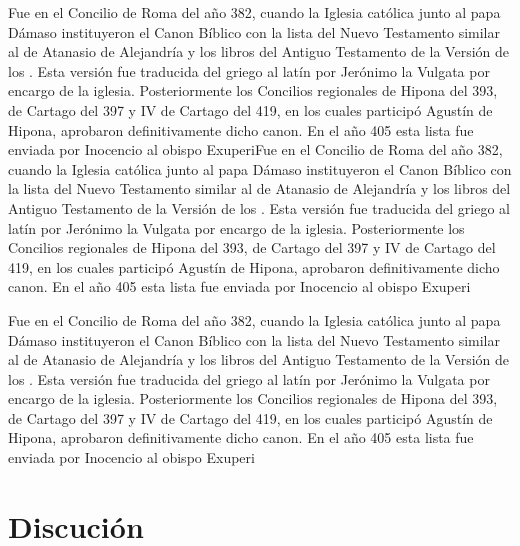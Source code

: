 \documentclass[a4paper,12pt]{article}
\begin{document}
Fue en el Concilio de Roma del año 382, cuando la Iglesia católica junto al papa Dámaso instituyeron el Canon Bíblico con la lista del Nuevo Testamento similar al de Atanasio de Alejandría y los libros del Antiguo Testamento de la Versión de los . Esta versión fue traducida del griego al latín por Jerónimo la Vulgata por encargo de la iglesia. Posteriormente los Concilios regionales de Hipona del 393,  de Cartago del 397 y IV de Cartago del 419, en los cuales participó Agustín de Hipona, aprobaron definitivamente dicho canon. En el año 405 esta lista fue enviada por Inocencio al obispo ExuperiFue en el Concilio de Roma del año 382, cuando la Iglesia católica junto al papa Dámaso instituyeron el Canon Bíblico con la lista del Nuevo Testamento similar al de Atanasio de Alejandría y los libros del Antiguo Testamento de la Versión de los . Esta versión fue traducida del griego al latín por Jerónimo la Vulgata por encargo de la iglesia. Posteriormente los Concilios regionales de Hipona del 393,  de Cartago del 397 y IV de Cartago del 419, en los cuales participó Agustín de Hipona, aprobaron definitivamente dicho canon. En el año 405 esta lista fue enviada por Inocencio al obispo Exuperi

Fue en el Concilio de Roma del año 382, cuando la Iglesia católica junto al papa Dámaso instituyeron el Canon Bíblico con la lista del Nuevo Testamento similar al de Atanasio de Alejandría y los libros del Antiguo Testamento de la Versión de los . Esta versión fue traducida del griego al latín por Jerónimo la Vulgata por encargo de la iglesia. Posteriormente los Concilios regionales de Hipona del 393,  de Cartago del 397 y IV de Cartago del 419, en los cuales participó Agustín de Hipona, aprobaron definitivamente dicho canon. En el año 405 esta lista fue enviada por Inocencio al obispo Exuperi

\section{Discución}
\end{document}
